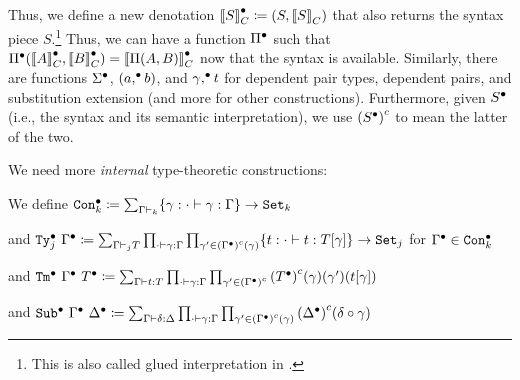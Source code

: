 Thus, we define a new denotation ${\llbracket {S} \rrbracket}_C^\bullet \coloneq (S, {\llbracket {S} \rrbracket}_C)$
that also returns the syntax piece $S$.\footnote{This is also called
glued interpretation in \citet{sterling2019algebraic}.}
Thus, we can have a
function ${\Pi}^\bullet$ such that $\Pi^\bullet({{\llbracket {A} \rrbracket}_C^\bullet},{{\llbracket {B} \rrbracket}_C^\bullet}) =
{\llbracket {\ensuremath{\Pi({A},{B})}} \rrbracket}_C^\bullet$ now that the syntax is available.
Similarly, there are functions ${\Sigma}^\bullet$, $({a},^\bullet{b})$, and
${\gamma},^\bullet{t}$ for dependent pair types, dependent pairs, and
substitution extension (and more for other constructions).
Furthermore, given ${S}^\bullet$ (i.e., the syntax and its semantic interpretation),
we use ${({{S}^\bullet})}^c$ to mean the latter of the two.%

\newcommand{\GTy}[2]{\ensuremath{\Glued{\texttt{Ty}}_{#1}~{#2}}}
\newcommand{\GCon}[1]{\ensuremath{\Glued{\texttt{Con}}_{#1}}}
\newcommand{\GTm}[2]{\ensuremath{\Glued{\texttt{Tm}}~{#1}~{#2}}}
\newcommand{\GSub}[2]{\ensuremath{\Glued{\texttt{Sub}}~{#1}~{#2}}}
\newcommand{\GMWSig}[3]{\ensuremath{{\texttt{WSig}^C}_{#1}^{#3}~{#2}}}
\newcommand{\GWSig}[3]{\ensuremath{{\Glued{\texttt{WSig}}}_{#1}^{#3}~{#2}}}


We need more \emph{internal} type-theoretic constructions:

We define $\GCon{k} \coloneq \sum_{\goodCtx{\Gm}{k}} \{\gm : \goodSub{\cdot}{\gm}{\Gm} \} \to \Set{k}$ 


and $\GTy{j}{\Glued{\Gm}} \coloneq \sum_{\goodType{\Gm}{T}{j}} \prod_{\goodSub{\cdot}{\gm}{\Gm}}\prod_{\gm' \in \Gmodel{\Glued{\Gm}}(\gm)}\{t : \goodTerm{\cdot}{t}{\sub{T}{\gm}}\}\to\Set{j} $ for $\Glued{\Gm} \in \GCon{k}$

and $\GTm{\Glued{\Gm}}{\Glued{T}} \coloneq \sum_{\goodTerm{\Gm}{t}{T}} \prod_{\goodSub{\cdot}{\gm}{\Gm}} \prod_{\gm' \in\Gmodel{\Glued{\Gm}}} \Gmodel{\Glued{T}}(\gm)(\gm')(\sub{t}{\gm})$

and $\GSub{\Glued{\Gm}}{\Glued{\Dl}} \coloneq \sum_{\goodSub{\Gm}{\delta}{\Dl}} \prod_{\goodSub{\cdot}{\gm}{\Gm}} \prod_{\gm' \in \Gmodel{\Glued{\Gm}}(\gm)} \Gmodel{\Glued{\Dl}}(\delta \circ \gm) $


